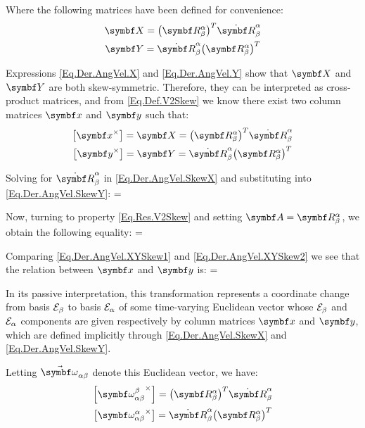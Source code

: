 Where the following matrices have been defined for convenience:
\begin{gather*}
\mat{X} =  \trp{\RotM{\alpha}{\beta}} \RotMDot{\alpha}{\beta} \\
\mat{Y} = \RotMDot{\alpha}{\beta} \trp{\RotM{\alpha}{\beta}} 
\end{gather*}

Expressions \eqref{Eq.Der.AngVel.X} and \eqref{Eq.Der.AngVel.Y} show that $\mat{X}$ and $\mat{Y}$ are both skew-symmetric. Therefore, they can be interpreted as cross-product matrices, and from \eqref{Eq.Def.V2Skew} we know there exist two column matrices $\mcol{x}$ and $\mcol{y}$ such that:
\begin{gather}
\vskew{\mcol{x}} = \mat{X} = \trp{\RotM{\alpha}{\beta}} \RotMDot{\alpha}{\beta} \label{Eq.Der.AngVel.SkewX}\\
\vskew{\mcol{y}} = \mat{Y} = \RotMDot{\alpha}{\beta} \trp{\RotM{\alpha}{\beta}} \label{Eq.Der.AngVel.SkewY}
\end{gather}

Solving for $\RotMDot{\alpha}{\beta}$ in \eqref{Eq.Der.AngVel.SkewX} and substituting into \eqref{Eq.Der.AngVel.SkewY}:
{
 = \RotM{\alpha}{\beta}  \trp{\RotM{\alpha}{\beta}}
}

Now, turning to property \eqref{Eq.Res.V2Skew} and setting $\mat{A}=\RotM{\alpha}{\beta}$, we obtain the following equality:
{
 = \RotM{\alpha}{\beta}  \trp{\RotM{\alpha}{\beta}}
}

Comparing \eqref{Eq.Der.AngVel.XYSkew1} and \eqref{Eq.Der.AngVel.XYSkew2} we see that the relation between $\mcol{x}$ and $\mcol{y}$ is:
\eqnl
{
 = \RotM{\alpha}{\beta} 
}

In its passive interpretation, this transformation represents a coordinate change from basis $\basis[\beta]$ to basis $\basis[\alpha]$ of some time-varying Euclidean vector whose $\basis[\beta]$ and $\basis[\alpha]$ components are given respectively by column matrices $\mcol{x}$ and $\mcol{y}$, which are defined implicitly through \eqref{Eq.Der.AngVel.SkewX} and \eqref{Eq.Der.AngVel.SkewY}.

Letting $\varel{\angvelsymb}{\alpha}{\beta}$ denote this Euclidean vector, we have:
\begin{gather}
\vskew{\angvel{\alpha}{\beta}{\beta}} = \trp{\RotM{\alpha}{\beta}} \RotMDot{\alpha}{\beta}  \label{Eq.Def.AngVel.SkewBeta}\\
\vskew{\angvel{\alpha}{\beta}{\alpha}}  = \RotMDot{\alpha}{\beta} \trp{\RotM{\alpha}{\beta}} \label{Eq.Def.AngVel.SkewAlpha}
\end{gather}

